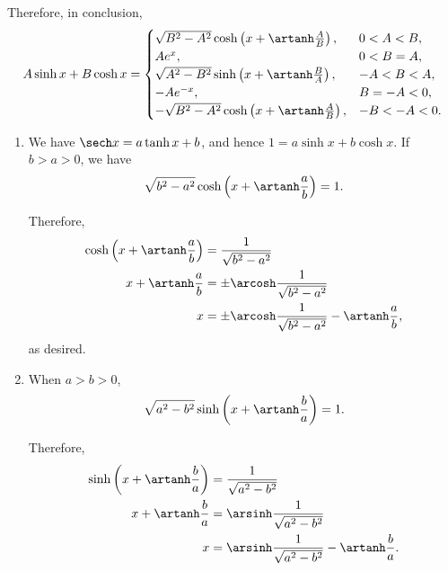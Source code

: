 Therefore, in conclusion,
\[
    A \sinh x + B \cosh x =
    \begin{cases}
        \sqrt{B^2 - A^2} \cosh \left(x + \artanh \frac{A}{B}\right),  & 0 < A < B,   \\
        Ae^x,                                                         & 0 < B = A,   \\
        \sqrt{A^2 - B^2} \sinh \left(x + \artanh \frac{B}{A}\right),  & -A < B < A,  \\
        -Ae^{-x},                                                     & B = -A < 0,  \\
        -\sqrt{B^2 - A^2} \cosh \left(x + \artanh \frac{A}{B}\right), & -B < -A < 0. \\
    \end{cases}
\]

\begin{enumerate}
    \item We have \(\sech x = a \tanh x + b\), and hence \(1 = a \sinh x + b \cosh x\).
          If \(b > a > 0\), we have
          \[
              \sqrt{b^2 - a^2} \cosh \left(x + \artanh \frac{a}{b}\right) = 1.
          \]

          Therefore,
          \begin{align*}
              \cosh \left(x + \artanh \frac{a}{b}\right) & = \frac{1}{\sqrt{b^2 - a^2}}                                    \\
              x + \artanh \frac{a}{b}                    & = \pm \arcosh \frac{1}{\sqrt{b^2 - a^2}}                        \\
              x                                          & = \pm \arcosh \frac{1}{\sqrt{b^2 - a^2}} - \artanh \frac{a}{b},
          \end{align*}
          as desired.

    \item When \(a > b > 0\),
          \[
              \sqrt{a^2 - b^2} \sinh \left(x + \artanh \frac{b}{a}\right) = 1.
          \]

          Therefore,
          \begin{align*}
              \sinh \left(x + \artanh \frac{b}{a}\right) & = \frac{1}{\sqrt{a^2 - b^2}}                                \\
              x + \artanh \frac{b}{a}                    & = \arsinh \frac{1}{\sqrt{a^2 - b^2}}                        \\
              x                                          & = \arsinh \frac{1}{\sqrt{a^2 - b^2}} - \artanh \frac{b}{a}.
          \end{align*}


\end{enumerate}
